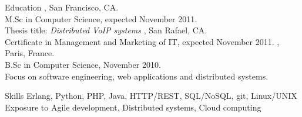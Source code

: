 \documentclass{resume}
\author{~~~~~~Edouard Swiac}
\begin{document}
\maketitle


\begin{category}{Education}
, San Francisco, CA.\\
M.Sc in Computer Science, expected November 2011.\\
Thesis title: \emph{Distributed VoIP systems}
, San Rafael, CA.\\
Certificate in Management and Marketing of IT, expected November 2011.
, Paris, France.\\
B.Sc in Computer Science, November 2010.\\
Focus on software engineering, web applications and distributed systems.
\end{category}


\begin{category}{Skills}
\citemnobullet 
Erlang, Python, PHP, Java, HTTP/REST, SQL/NoSQL, git, Linux/UNIX\\
Exposure to Agile development, Distributed systems, Cloud computing
\end{category}
\end{document}
